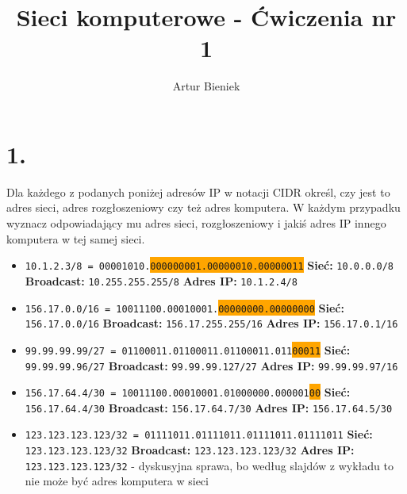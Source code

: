 \documentclass{article}
\begin{document}
\title{Sieci komputerowe - Ćwiczenia nr 1}
\author{Artur Bieniek}

\maketitle

\section*{1.}
Dla każdego z podanych poniżej adresów IP w notacji CIDR określ, czy jest to adres sieci, adres
rozgłoszeniowy czy też adres komputera. W każdym przypadku wyznacz odpowiadający mu adres
sieci, rozgłoszeniowy i jakiś adres IP innego komputera w tej samej sieci.
\begin{itemize}
    \item \texttt{10.1.2.3/8 = 00001010.\colorbox{Orange}{000000001.00000010.00000011}}
    \newline \textbf{Sieć:} \texttt{10.0.0.0/8}
    \newline \textbf{Broadcast:} \texttt{10.255.255.255/8}
    \newline \textbf{Adres IP:} \texttt{10.1.2.4/8}

    \item \texttt{156.17.0.0/16 = 10011100.00010001.\colorbox{Orange}{00000000.00000000}}
    \newline \textbf{Sieć:} \texttt{156.17.0.0/16}
    \newline \textbf{Broadcast:} \texttt{156.17.255.255/16}
    \newline \textbf{Adres IP:} \texttt{156.17.0.1/16}

    \item \texttt{99.99.99.99/27 = 01100011.01100011.01100011.011\colorbox{Orange}{00011}}
    \newline \textbf{Sieć:} \texttt{99.99.99.96/27}
    \newline \textbf{Broadcast:} \texttt{99.99.99.127/27}
    \newline \textbf{Adres IP:} \texttt{99.99.99.97/16}

    \item \texttt{156.17.64.4/30 = 10011100.00010001.01000000.000001\colorbox{Orange}{00}}
    \newline \textbf{Sieć:} \texttt{156.17.64.4/30}
    \newline \textbf{Broadcast:} \texttt{156.17.64.7/30}
    \newline \textbf{Adres IP:} \texttt{156.17.64.5/30}

    \item \texttt{123.123.123.123/32 = 01111011.01111011.01111011.01111011}
    \newline \textbf{Sieć:} \texttt{123.123.123.123/32}
    \newline \textbf{Broadcast:} \texttt{123.123.123.123/32}
    \newline \textbf{Adres IP:} \texttt{123.123.123.123/32} - dyskusyjna sprawa, bo według slajdów z wykładu to nie może być adres komputera w sieci
\end{itemize}
\end{document}
